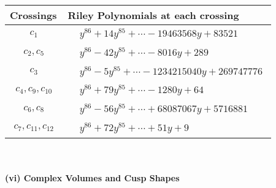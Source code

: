 \documentclass[1p]{elsarticle_modified}
\theoremstyle{definition}
\begin{document}
\begin{tabular}{m{50pt}|m{274pt}}
Crossings & \hspace{64pt}Riley Polynomials at each crossing \\
\hline $$\begin{aligned}c_{1}\end{aligned}$$&$\begin{aligned}
&y^{86}+14 y^{85}+\cdots-19463568 y+83521
\end{aligned}$\\
\hline $$\begin{aligned}c_{2},c_{5}\end{aligned}$$&$\begin{aligned}
&y^{86}-42 y^{85}+\cdots-8016 y+289
\end{aligned}$\\
\hline $$\begin{aligned}c_{3}\end{aligned}$$&$\begin{aligned}
&y^{86}-5 y^{85}+\cdots-1234215040 y+269747776
\end{aligned}$\\
\hline $$\begin{aligned}c_{4},c_{9},c_{10}\end{aligned}$$&$\begin{aligned}
&y^{86}+79 y^{85}+\cdots-1280 y+64
\end{aligned}$\\
\hline $$\begin{aligned}c_{6},c_{8}\end{aligned}$$&$\begin{aligned}
&y^{86}-56 y^{85}+\cdots+68087067 y+5716881
\end{aligned}$\\
\hline $$\begin{aligned}c_{7},c_{11},c_{12}\end{aligned}$$&$\begin{aligned}
&y^{86}+72 y^{85}+\cdots+51 y+9
\end{aligned}$\\
\hline
\end{tabular}\\~\\
\newpage\flushleft \textbf{(vi) Complex Volumes and Cusp Shapes}
\end{document}
